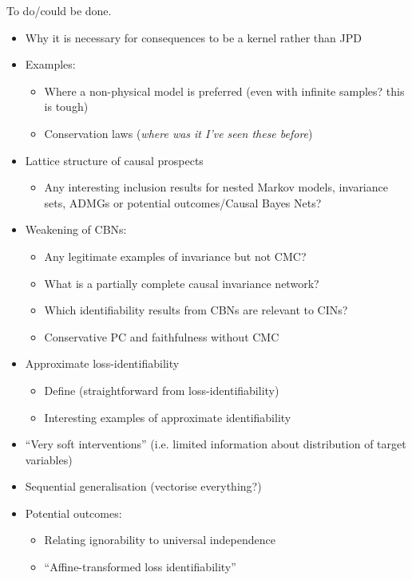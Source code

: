 To do/could be done.
\begin{itemize}
    \item Why it is necessary for consequences to be a kernel rather than JPD
    \item Examples:
    \begin{itemize}
        \item Where a non-physical model is preferred (even with infinite samples? this is tough)
        \item Conservation laws (\emph{where was it I've seen these before})
    \end{itemize}
    \item Lattice structure of causal prospects
    \begin{itemize}
        \item Any interesting inclusion results for nested Markov models, invariance sets, ADMGs or potential outcomes/Causal Bayes Nets?
    \end{itemize}
    \item Weakening of CBNs:
    \begin{itemize}
        \item Any legitimate examples of invariance but not CMC?
        \item What is a partially complete causal invariance network?
        \item Which identifiability results from CBNs are relevant to CINs?
        \item Conservative PC and faithfulness without CMC
    \end{itemize}
    \item Approximate loss-identifiability
    \begin{itemize}
        \item Define (straightforward from loss-identifiability)
        \item Interesting examples of approximate identifiability
    \end{itemize}
    \item ``Very soft interventions'' (i.e. limited information about distribution of target variables)
    \item Sequential generalisation (vectorise everything?)
    \item Potential outcomes:
    \begin{itemize}
        \item Relating ignorability to universal independence
        \item ``Affine-transformed loss identifiability''

\end{itemize}
\end{itemize}
